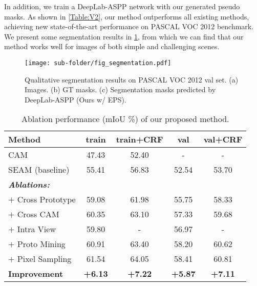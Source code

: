 \documentclass[10pt,twocolumn,letterpaper]{article}
\begin{document}
In addition, we train a DeepLab-ASPP network with our generated pseudo masks. As shown in \cref{Table:V2}, our method outperforms all existing methods, achieving new state-of-the-art performance on PASCAL VOC 2012 benchmark. We present some segmentation results in \cref{fig:seg_results}, from which we can find that our method works well for images of both simple and challenging scenes. 




\begin{figure}[tp]
\centering
\begin{center}
\texttt{[image: sub-folder/fig\_segmentation.pdf]}
\end{center}
\caption{Qualitative segmentation results on PASCAL VOC 2012 val set. (a) Images. (b) GT masks. (c) Segmentation masks predicted by DeepLab-ASPP (Ours w/ EPS).}
\label{fig:seg_results}
\end{figure}



\begin{table}[tp]
\caption{Ablation performance (mIoU \%) of our proposed method. }
\label{Ablation1}
\centering
\small
\begin{tabular}{l|c|c|c|c}
\hline
\textbf{Method}      & \textbf{train} & \textbf{train}\scriptsize{+CRF} & \textbf{val} & \textbf{val}\scriptsize{+CRF} \\
\hline \hline
CAM                  & 47.43          & 52.40              & -            & -                \\
SEAM (baseline)    & 55.41          & 56.83              & 52.54        & 53.70            \\ 
\hline
\multicolumn{5}{l}{\textit{\textbf{Ablations:}}}                                             \\
$+$ Cross Prototype     & 59.08          & 61.98              & 55.75        & 58.33            \\
$+$ Cross CAM           & 60.35          & 63.10              & 57.33        & 59.68            \\
$+$ Intra View          & 59.80          & -                  & 56.97        & -                \\
$+$ Proto Mining        & 60.91          & 63.40              & 58.20        & 60.62            \\
$+$ Pixel Sampling      & 61.54          & 64.05              & 58.41        & 60.81            \\
\hline
\textbf{Improvement} &\textbf{+6.13 }          & \textbf{+7.22}               &\textbf{+5.87}         &\textbf{+7.11} \\
\hline
\end{tabular}
\end{table}
\end{document}
